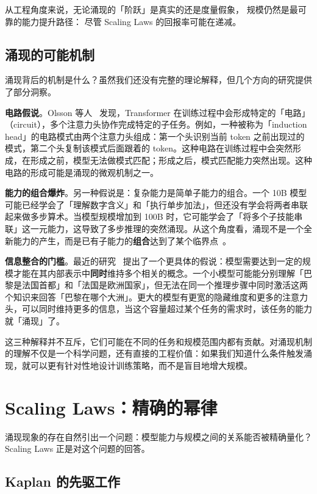 从工程角度来说，无论涌现的「阶跃」是真实的还是度量假象，
规模仍然是最可靠的能力提升路径：
尽管 Scaling Laws 的回报率可能在递减。

\subsection{涌现的可能机制}

涌现背后的机制是什么？虽然我们还没有完整的理论解释，但几个方向的研究提供了部分洞察。

\textbf{电路假说}。Olsson 等人~\cite{olsson2022induction} 发现，Transformer 在训练过程中会形成特定的「电路」（circuit），多个注意力头协作完成特定的子任务。例如，一种被称为「induction head」的电路模式由两个注意力头组成：第一个头识别当前 token 之前出现过的模式，第二个头复制该模式后面跟着的 token。这种电路在训练过程中会突然形成，在形成之前，模型无法做模式匹配；形成之后，模式匹配能力突然出现。这种电路的形成可能是涌现的微观机制之一。

\textbf{能力的组合爆炸}。另一种假说是：复杂能力是简单子能力的组合。一个 10B 模型可能已经学会了「理解数字含义」和「执行单步加法」，但还没有学会将两者串联起来做多步算术。当模型规模增加到 100B 时，它可能学会了「将多个子技能串联」这一元能力，这导致了多步推理的突然涌现。从这个角度看，涌现不是一个全新能力的产生，而是已有子能力的\textbf{组合}达到了某个临界点~\cite{arora2023theory}。

\textbf{信息整合的门槛}。最近的研究~\cite{wei2023larger} 提出了一个更具体的假说：模型需要达到一定的规模才能在其内部表示中\textbf{同时}维持多个相关的概念。一个小模型可能能分别理解「巴黎是法国首都」和「法国是欧洲国家」，但无法在同一个推理步骤中同时激活这两个知识来回答「巴黎在哪个大洲」。更大的模型有更宽的隐藏维度和更多的注意力头，可以同时维持更多的信息，当这个容量超过某个任务的需求时，该任务的能力就「涌现」了。

这三种解释并不互斥，它们可能在不同的任务和规模范围内都有贡献。对涌现机制的理解不仅是一个科学问题，还有直接的工程价值：如果我们知道什么条件触发涌现，就可以更有针对性地设计训练策略，而不是盲目地增大规模。

\section{Scaling Laws：精确的幂律}
\label{sec:scaling-laws}

涌现现象的存在自然引出一个问题：模型能力与规模之间的关系能否被精确量化？Scaling Laws 正是对这个问题的回答。

\subsection{Kaplan 的先驱工作}

